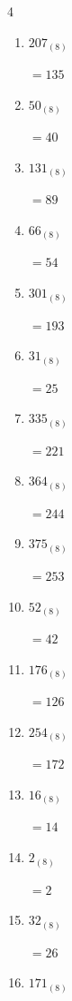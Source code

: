 \begin{multicols}{4}
\begin{enumerate}
        $=213$

\columnbreak %

  \item $207_{(8)}$

        $=135$

  \item $50_{(8)}$

        $=40$

  \item $131_{(8)}$

        $=89$

  \item $66_{(8)}$

        $=54$

  \item $301_{(8)}$

        $=193$

  \item $31_{(8)}$

        $=25$

  \item $335_{(8)}$

        $=221$

  \item $364_{(8)}$

        $=244$

  \item $375_{(8)}$

        $=253$

  \item $52_{(8)}$

        $=42$

  \item $176_{(8)}$

        $=126$

  \item $254_{(8)}$

        $=172$

  \item $16_{(8)}$

        $=14$

  \item $2_{(8)}$

        $=2$

  \item $32_{(8)}$

        $=26$

\columnbreak %

  \item $171_{(8)}$


\end{enumerate}
\end{multicols}
